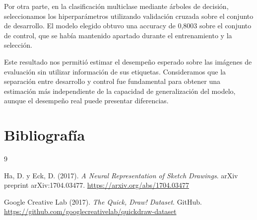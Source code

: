 \documentclass[11pt,a4paper]{article}
\begin{document}
Por otra parte, en la clasificación multiclase
mediante árboles de decisión, seleccionamos los
hiperparámetros utilizando validación cruzada sobre
el conjunto de desarrollo. El modelo elegido obtuvo
una accuracy de 0,8003 sobre el conjunto de control,
que se había mantenido apartado durante el
entrenamiento y la selección.

Este resultado nos permitió estimar el desempeño
esperado sobre las imágenes de evaluación sin utilizar información de sus etiquetas.
Consideramos que la separación entre desarrollo y
control fue fundamental para obtener una estimación
más independiente de la capacidad de generalización
del modelo, aunque el desempeño
real puede presentar diferencias.


\section{Bibliografía}

\begin{thebibliography}{9}

Ha, D. y Eck, D. (2017).
\textit{A Neural Representation of Sketch Drawings}.
arXiv preprint arXiv:1704.03477.
\url{https://arxiv.org/abs/1704.03477}

Google Creative Lab (2017).
\textit{The Quick, Draw! Dataset}.
GitHub.
\url{https://github.com/googlecreativelab/quickdraw-dataset}


\end{thebibliography}
\end{document}
